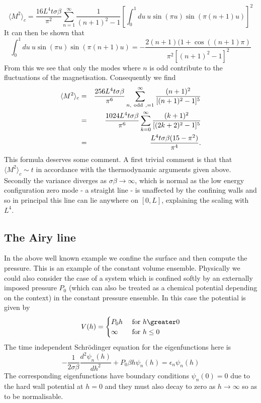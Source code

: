 \begin{equation}
\langle M^2\rangle_c=\frac{16L^4 t\sigma\beta }{\pi^2}\sum_{n=1}^\infty \frac{1}{(n+1)^2-1}\left[ \int_0^1 du \ u 
\sin(\pi u) \sin(\pi (n+1)u)\right]^2
\end{equation}
It can then be shown that
\begin{equation}
\int_0^1 du \ u 
\sin(\pi u) \sin(\pi (n+1)u)= -\frac{2(n+1) (1+ \cos((n+1)\pi)}{\pi^2[(n+1)^2-1]^2}
\end{equation}
From this we see that only the modes where $n$ is odd contribute to the fluctuations of the magnetisation. Consequently we find
\begin{eqnarray}
\langle M^2\rangle_c&=&\frac{256 L^4 t\sigma\beta }{\pi^6}\sum_{n,\ {\rm odd}\ ,=1}^\infty \frac{(n+1)^2}{[(n+1)^2-1]^5}\\
&=& \frac{1024L^4 t\sigma\beta }{\pi^6}\sum_{k=0}^\infty \frac{(k+1)^2}{[(2k+2)^2-1]^5}\\
&=& \frac{L^4 t\sigma\beta(15-\pi^2) }{\pi^4}.
\end{eqnarray}
This formula deserves some comment. A first trivial comment is that that $\langle M^2\rangle_c\sim t$ in accordance with the thermodynamic arguments given above. Secondly the variance diverges as $\sigma\beta\to\infty$, which is normal as the low energy configuration zero mode  - a straight line - is unaffected by the confining walls and so in principal this line can lie anywhere on $[0,L ]$, explaining the scaling with $L^4$.


\subsection{The Airy line}
In the  above well known example we confine the surface and then compute the pressure. This is an example of the constant volume ensemble. Physically we could also consider the case of a system which is confined softly by an externally imposed pressure $P_0$ (which can also be treated as a chemical potential depending on the context) in the constant pressure ensemble. In this case the potential is given by
\begin{align}
V(h) = \begin{cases} P_0 h  &\ { \rm for }\ h \greater 0 \nn \infty &\ {\rm for}\ h\leq 0 \end{cases}
\end{align}
The time independent Schr\"odinger equation for the eigenfunctions here is
\begin{equation}
-\frac{1}{2\sigma\beta}\frac{d^2 \psi_n(h)}{dh^2} + P_0\beta h \psi_n(h) = \epsilon_n\psi_n(h)
\end{equation}
The corresponding eigenfunctions have boundary conditions $\psi_n(0)=0$ due to the hard wall potential at $h=0$ and they must also decay to zero as $h\to \infty$ so as to be normalisable.

